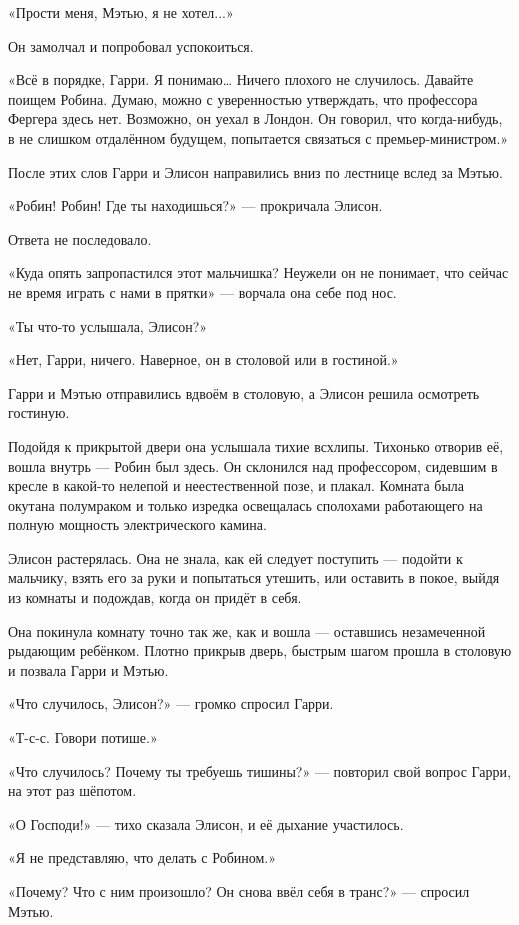 \documentclass[a5paper, 9pt,
final, openany, twoside=true]{memoir}
\begin{document}
«Прости меня, Мэтью, я не хотел...»

Он замолчал и попробовал успокоиться.

«Всё в порядке, Гарри. Я понимаю… Ничего плохого не случилось. Давайте поищем Робина. Думаю, можно с уверенностью утверждать, что профессора Фергера здесь нет. Возможно, он уехал в Лондон. Он говорил, что когда-нибудь, в не слишком отдалённом будущем, попытается связаться с премьер-министром.»

После этих слов Гарри и Элисон направились вниз по лестнице вслед за Мэтью.

«Робин! Робин! Где ты находишься?» — прокричала Элисон.

Ответа не последовало.

«Куда опять запропастился этот мальчишка? Неужели он не понимает, что сейчас не время играть с нами в прятки» — ворчала она себе под нос.

«Ты что-то услышала, Элисон?»

«Нет, Гарри, ничего. Наверное, он в столовой или в гостиной.»

Гарри и Мэтью отправились вдвоём в столовую, а Элисон решила осмотреть гостиную.

Подойдя к прикрытой двери она услышала тихие всхлипы. Тихонько отворив её, вошла внутрь — Робин был здесь. Он склонился над профессором, сидевшим в кресле в какой-то нелепой и неестественной позе, и плакал. Комната была окутана полумраком и только изредка освещалась сполохами работающего на полную мощность электрического камина.

Элисон растерялась. Она не знала, как ей следует поступить — подойти к мальчику, взять его за руки и попытаться утешить, или оставить в покое, выйдя из комнаты и подождав, когда он придёт в себя.

Она покинула комнату точно так же, как и вошла —  оставшись незамеченной рыдающим ребёнком. Плотно прикрыв дверь, быстрым шагом прошла в столовую и позвала Гарри и Мэтью.

«Что случилось, Элисон?» — громко спросил Гарри.

«Т-с-с. Говори потише.»

«Что случилось? Почему ты требуешь тишины?» — повторил свой вопрос Гарри, на этот раз шёпотом.

«О Господи!» — тихо сказала Элисон, и её дыхание участилось.

«Я не представляю, что делать с Робином.»

«Почему? Что с ним произошло? Он снова ввёл себя в транс?» — спросил Мэтью.
\end{document}
